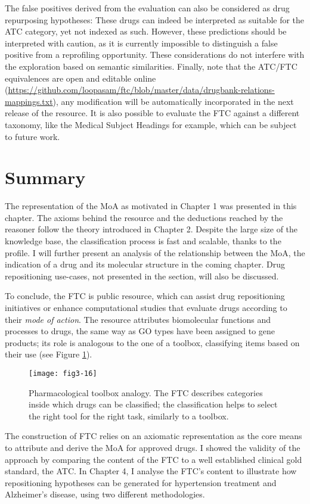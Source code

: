The false positives derived from the evaluation can also be considered as drug repurposing hypotheses: These drugs can indeed be interpreted as suitable for the ATC category, yet not indexed as such. However, these predictions should be interpreted with caution, as it is currently impossible to distinguish a false positive from a reprofiling opportunity. These considerations do not interfere with the exploration based on semantic similarities. Finally, note that the ATC/FTC equivalences are open and editable online (\url{https://github.com/loopasam/ftc/blob/master/data/drugbank-relations-mappings.txt}), any modification will be automatically incorporated in the next release of the resource. It is also possible to evaluate the FTC against a different taxonomy, like the Medical Subject Headings for example, which can be subject to future work.

\section{Summary}
The representation of the MoA as motivated in Chapter 1 was presented in this chapter. The axioms behind the resource and the deductions reached by the reasoner follow the theory introduced in Chapter 2. Despite the large size of the knowledge base, the classification process is fast and scalable, thanks to the  profile. I will further present an analysis of the relationship between the MoA, the indication of a drug and its molecular structure in the coming chapter. Drug repositioning use-cases, not presented in the section, will also be discussed.

To conclude, the FTC is public resource, which can assist drug repositioning initiatives or enhance computational studies that evaluate drugs according to their \emph{mode of action}. The resource attributes biomolecular functions and processes to drugs, the same way as GO types have been assigned to gene products; its role is analogous to the one of a toolbox, classifying items based on their use (see Figure \ref{fig3-16}).

\begin{figure}[H]
    \centering
    \texttt{[image: fig3-16]}
    \caption{Pharmacological toolbox analogy. The FTC describes categories inside which drugs can be classified; the classification helps to select the right tool for the right task, similarly to a toolbox.}
    \label{fig3-16}
\end{figure}

The construction of FTC relies on an axiomatic representation as the core means to attribute and derive the MoA for approved drugs. I showed the validity of the approach by comparing the content of the FTC to a well established clinical gold standard, the ATC. In Chapter 4, I analyse the FTC's content to illustrate how repositioning hypotheses can be generated for hypertension treatment and Alzheimer's disease, using two different methodologies.

